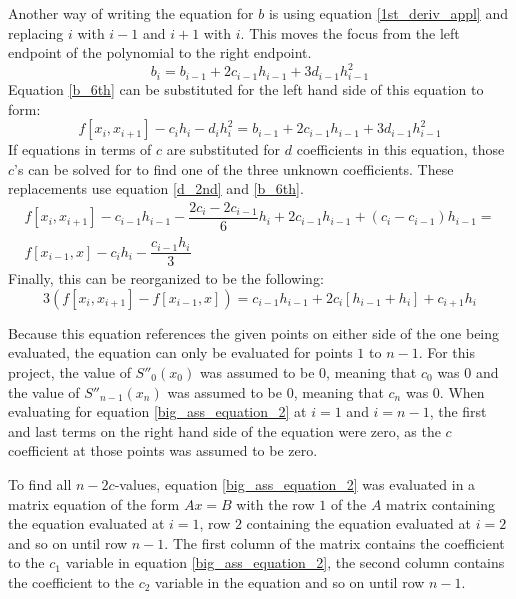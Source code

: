 \documentclass[12pt, letterpaper]{article} %
\begin{document}
Another way of writing the equation for $b$ is using equation \ref{1st_deriv_appl} and replacing $i$ with $i-1$ and $i+1$ with $i$. This moves the focus from the left endpoint of the polynomial to the right endpoint.
\begin{equation}
b_i = b_{i-1} + 2c_{i-1}h_{i-1} + 3d_{i-1}h_{i-1}^2
\label{2ndary_bi}
\end{equation}
Equation \ref{b_6th} can be substituted for the left hand side of this equation to form:
\begin{equation}
f[x_i,x_{i+1}] - c_ih_i - d_ih_i^2 = b_{i-1} + 2c_{i-1}h_{i-1} + 3d_{i-1}h_{i-1}^2
\end{equation}
If equations in terms of $c$ are substituted for $d$ coefficients in this equation, those $c$'s can be solved for to find one of the three unknown coefficients. These replacements use equation \ref{d_2nd} and \ref{b_6th}.
\begin{multline}
f[x_i,x_{i+1}] - c_{i-1}h_{i-1} - \dfrac{2c_i-2c_{i-1}}{6}h_i + 2c_{i-1}h_{i-1} + (c_i-c_{i-1})h_{i-1} = \\ f[x_{i-1},x] - c_ih_i - \dfrac{c_{i-1}h_i}{3}
\label{big_ass_equation}
\end{multline}
Finally, this can be reorganized to be the following:
\begin{equation}
3(f[x_i,x_{i+1}] - f[x_{i-1},x]) =
c_{i-1}h_{i-1} + 2c_i[h_{i-1}+h_i] + c_{i+1}h_i
\label{big_ass_equation_2}
\end{equation}

Because this equation references the given points on either side of the one being evaluated, the equation can only be evaluated for points $1$ to $n-1$. For this project, the value of $S''_0(x_0)$ was assumed to be $0$, meaning that $c_0$ was $0$ and the value of $S''_{n-1}(x_n)$ was assumed to be $0$, meaning that $c_n$ was $0$. When evaluating for equation \ref{big_ass_equation_2} at $i = 1$ and $i = n-1$, the first and last terms on the right hand side of the equation were zero, as the $c$ coefficient at those points was assumed to be zero.

To find all $n-2 c$-values, equation \ref{big_ass_equation_2} was evaluated in a matrix equation of the form $Ax = B$ with the row $1$ of the $A$ matrix containing the equation evaluated at $i = 1$, row $2$ containing the equation evaluated at $i = 2$ and so on until row $n-1$. The first column of the matrix contains the coefficient to the $c_1$ variable in equation \ref{big_ass_equation_2}, the second column contains the coefficient to the $c_2$ variable in the equation and so on until row $n-1$.
\end{document}
